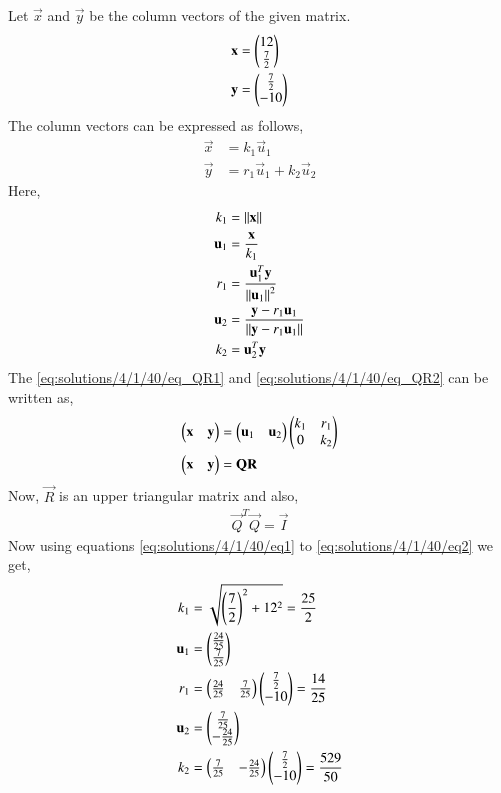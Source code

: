 Let $\vec{x}$ and $\vec{y}$ be the column vectors of the given matrix.
\begin{align}
    \mathbf{x} &= \begin{pmatrix}12 \\\frac{7}{2} \end{pmatrix}\\
    \mathbf{y} &= \begin{pmatrix}\frac{7}{2} \\ -10\end{pmatrix}
\end{align}
The column vectors can be expressed as follows,
\begin{align}
    \vec{x} &= k_1\vec{u}_1\label{eq:solutions/4/1/40/eq_QR1}\\
    \vec{y} &= r_1\vec{u}_1+k_2\vec{u}_2\label{eq:solutions/4/1/40/eq_QR2}
\end{align}
Here, 
\begin{align}
    k_1 &= \left\lVert\mathbf{x}\right\rVert\label{eq:solutions/4/1/40/eq1}\\
    \mathbf{u}_1 &= \frac{\mathbf{x}}{k_1}\\
    r_1 &= \frac{\mathbf{u}_1^T\mathbf{y}}{\left\lVert\mathbf{u}_1\right\rVert^2}\\
    \mathbf{u}_2 &= \frac{\mathbf{y} - r_1 \mathbf{u}_1}{\left\lVert\mathbf{y} - r_1 \mathbf{u}_1\right\rVert}\\
    k_2 &= {\mathbf{u}_2^T\mathbf{y}}\label{eq:solutions/4/1/40/eq2}
\end{align}
The \eqref{eq:solutions/4/1/40/eq_QR1} and \eqref{eq:solutions/4/1/40/eq_QR2} can be written as, 
\begin{align}
\begin{pmatrix}\mathbf{x} & \mathbf{y}\end{pmatrix} &= \begin{pmatrix}\mathbf{u}_1 & \mathbf{u}_2\end{pmatrix}\begin{pmatrix}k_1 & r_1 \\ 0 & k_2\end{pmatrix}\label{eq:solutions/4/1/40/QRMain}\\
\begin{pmatrix}\mathbf{x} & \mathbf{y}\end{pmatrix} &= \mathbf{Q}\mathbf{R}
\end{align}
Now, $\vec{R}$ is an upper triangular matrix and also,
\begin{align}
\vec{Q}^T\vec{Q}=\vec{I}
\end{align}
Now using equations \eqref{eq:solutions/4/1/40/eq1} to \eqref{eq:solutions/4/1/40/eq2} we get, 
\begin{align}
    k_1 &= \sqrt{\left(\frac{7}{2}\right)^2+12^2} = \frac{25}{2}\label{eq:solutions/4/1/40/eqval1}\\ 
    \mathbf{u}_1 &= \begin{pmatrix}\frac{24}{25} \\ \frac{7}{25}\end{pmatrix} \\
    r_1 &= \begin{pmatrix}\frac{24}{25}&\frac{7}{25}\end{pmatrix}\begin{pmatrix}\frac{7}{2}\\-10\end{pmatrix} = \frac{14}{25}\\ 
    \mathbf{u}_2 &= \begin{pmatrix}\frac{7}{25} \\ -\frac{24}{25}\end{pmatrix} \\
    k_2 &= \begin{pmatrix}\frac{7}{25}&-\frac{24}{25}\end{pmatrix}\begin{pmatrix}\frac{7}{2}\\-10\end{pmatrix} = \frac{529}{50}\label{eq:solutions/4/1/40/eqval2} 
\end{align}
